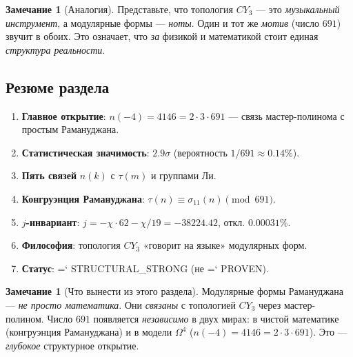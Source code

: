 \documentclass[11pt,a4paper]{article}
\newcommand{\CY}{CY_3}
\newcommand{\Om}{\Omega^4}
\renewcommand{\texttt}[1]{{\ttfamily\hyphenchar\font=`\- #1}}
\theoremstyle{definition}
\newtheorem{remark}[theorem]{Замечание}
\begin{document}
\begin{remark}[Аналогия]
\label{rem:modular-analogy}
Представьте, что топология $\CY$ — это \emph{музыкальный 
инструмент}, а модулярные формы — \emph{ноты}. 
Один и тот же \emph{мотив} (число $691$) звучит в обоих. 
Это означает, что \emph{за} физикой и математикой стоит 
единая \emph{структура реальности}.
\end{remark}

\subsection{Резюме раздела}
\label{subsec:modular-summary}

\begin{enumerate}
    \item \textbf{Главное открытие}: 
          $n(-4) = 4146 = 2 \cdot 3 \cdot 691$ — связь 
          мастер-полинома с простым Рамануджана.
    \item \textbf{Статистическая значимость}: 
          $2.9\sigma$ (вероятность $1/691 \approx 0.14\%$).
    \item \textbf{Пять связей} $n(k)$ с $\tau(m)$ и группами Ли.
    \item \textbf{Конгруэнция Рамануджана}: 
          $\tau(n) \equiv \sigma_{11}(n) \pmod{691}$.
    \item \textbf{$j$-инвариант}: 
          $j = -\chi \cdot 62 - \chi/19 = -38224.42$, 
          откл. $0.00031\%$.
    \item \textbf{Философия}: топология $\CY$ «говорит на языке» 
          модулярных форм.
    \item \textbf{Статус}: \texttt{STRUCTURAL\_STRONG} 
          (не \texttt{PROVEN}).
\end{enumerate}

\begin{remark}[Что вынести из этого раздела]
\label{rem:modular-takeaway}
Модулярные формы Рамануджана — \emph{не просто математика}. 
Они \emph{связаны} с топологией $\CY$ через мастер-полином. 
Число $691$ появляется \emph{независимо} в двух мирах: 
в чистой математике (конгруэнция Рамануджана) и в модели 
$\Om$ ($n(-4) = 4146 = 2 \cdot 3 \cdot 691$). 
Это — \emph{глубокое} структурное открытие.
\end{remark}

\end{document}
